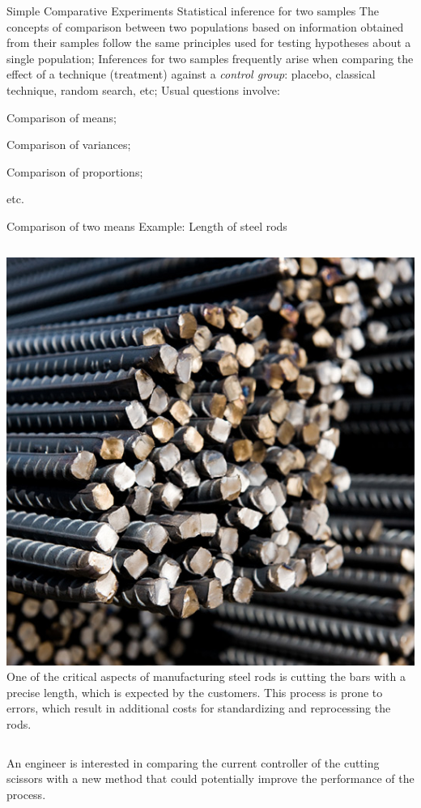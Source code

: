 \documentclass[t]{beamer}
\begin{document}

\begin{ftst}
{Simple Comparative Experiments}
{Statistical inference for two samples}
The concepts of comparison between two populations based on information obtained from their samples follow the same principles used for testing hypotheses about a single population;
\vone
Inferences for two samples frequently arise when comparing the effect of a technique (treatment) against a \textit{control group}: placebo, classical technique, random search, etc;
\vone
Usual questions involve:

\bitems Comparison of means;
\item Comparison of variances;
\item Comparison of proportions;
\item etc.
\eitem
\end{ftst}


\begin{ftst}
{Comparison of two means}
{Example: Length of steel rods}
\begin{columns}
\includegraphics[width=\textwidth]{../figs/steelrods.jpg}
One of the critical aspects of manufacturing steel rods is cutting the bars with a precise length, which is expected by the customers.
\vhalf
This process is prone to errors, which result in additional costs for standardizing and reprocessing the rods.
\end{columns}
\vone
An engineer is interested in comparing the current controller of the cutting scissors with a new method that could potentially improve the performance of the process.
\end{ftst}
\end{document}
